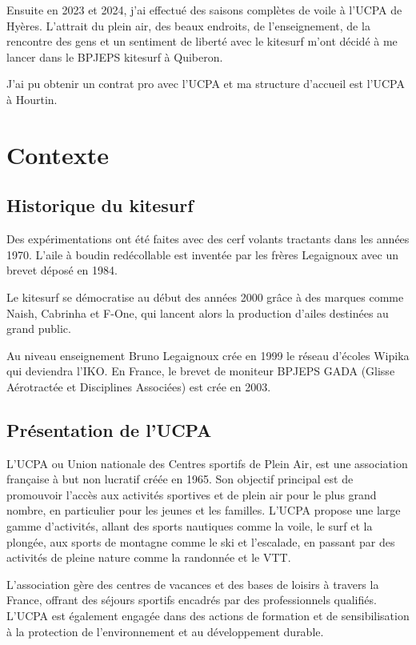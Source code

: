 \documentclass[11pt,a4paper]{report}
\begin{document}
Ensuite en 2023 et 2024, j'ai effectué des saisons complètes de voile
à l'UCPA\cite{ucpa} de Hyères. L'attrait du plein air, des beaux endroits,
de l'enseignement, de la rencontre des gens et un sentiment de liberté
avec le kitesurf  m'ont décidé à me lancer dans le BPJEPS kitesurf 
à Quiberon.

J'ai  pu obtenir un contrat pro avec l'UCPA et 
ma structure d'accueil est l'UCPA à Hourtin.

\section{Contexte}
\subsection{Historique du kitesurf}
Des expérimentations ont été faites avec des cerf volants tractants 
dans les années 1970. L'aile à boudin redécollable est inventée 
par les frères Legaignoux avec un brevet déposé en 1984\cite{brevet_kite}.

Le kitesurf se démocratise au début des années 2000 grâce à des
marques comme Naish, Cabrinha et F-One, qui lancent alors la 
production d’ailes destinées au grand public.

Au niveau enseignement Bruno Legaignoux crée en 1999 le
réseau d'écoles Wipika qui deviendra l'IKO\cite{iko}.
En France, le brevet de moniteur BPJEPS GADA (Glisse Aérotractée 
et Disciplines Associées) est crée en 2003.

\subsection{Présentation de l'UCPA}
L'UCPA ou Union nationale des Centres sportifs de Plein Air, est une association
française à but non lucratif  créée en 1965. Son objectif principal est
de promouvoir l'accès aux activités sportives et de plein air pour le plus grand
nombre, en particulier pour les jeunes et les familles. L'UCPA propose une large
gamme d'activités, allant des sports nautiques comme la voile, le surf et la plongée,
aux sports de montagne comme le ski et l'escalade, en passant par des activités de
pleine nature comme la randonnée et le VTT.

L'association gère des centres de vacances et des bases de loisirs à travers la
France, offrant des séjours sportifs encadrés par des professionnels qualifiés.
L'UCPA est également engagée dans des actions de formation et de sensibilisation 
à la protection de l'environnement et au développement durable.
\end{document}
